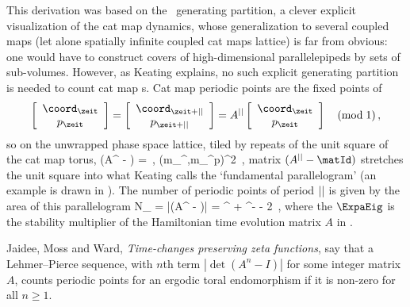 This derivation was based on the \AW\ generating partition, a clever
explicit visualization of the cat map dynamics, whose generalization to
several coupled maps (let alone spatially infinite coupled cat
maps lattice) is far from obvious: one would have to construct covers of
high-dimensional parallelepipeds by sets of sub-volumes.
However, as Keating explains, no such explicit generating
partition is needed to count cat map \po s.
Cat map  periodic points are the fixed points of
\[
\left[\begin{array}{c}
  \coord_\zeit  \\ p_\zeit
  \end{array}\right]
=
   \left[\begin{array}{c}
  \coord_{\zeit+\cl{}}  \\ p_{\zeit+\cl{}}
  \end{array}\right]
=
  A^\cl{}
  \left[\begin{array}{c}
  \coord_\zeit  \\ p_\zeit
  \end{array}\right]
  \quad (\mbox{mod}\;1)
\,,
\]
so on the unwrapped phase space lattice, tiled by repeats of the
unit square of the cat map torus,
\beq
 (A^\cl{} - \matId)
=
\,,\qquad
    (m_{\zeit}^\coord,m_{\zeit}^p)\in\integers^2
\,,
matrix $(A^\cl{} - \matId)$ stretches the unit square into what Keating
calls the `fundamental parallelogram' (an example is drawn in
). The number of periodic points of period ${||}$ is
given by the area of this parallelogram
\beq
N_{\cl{}} = |\det(A^{\cl{}} - \matId)|
            = \ExpaEig^{\cl{}} + \ExpaEig^{-\cl{}} - 2
\,,
where the $\ExpaEig$ is the stability multiplier  of the
Hamiltonian time evolution matrix $A$ in .

Jaidee, Moss and Ward,
{\em Time-changes preserving zeta functions}, say that
a Lehmer–Pierce sequence, with $n$th term
\(
|\det(A^n-I)|
\)
for some integer matrix $A$, counts periodic points for an ergodic toral
endomorphism if it is non-zero for all $n\geq1$.

